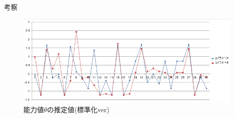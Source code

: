 \documentclass[aspectratio=169, dvipdfmx, 12pt]{beamer}
\begin{document}
\begin{frame}
  \begin{block}{考察}
    \vspace{3.5cm}
    \begin{figure}[H]
      \centering
      \includegraphics[bb = 550 100 1 1,scale = 0.7]{bay2bay3.png}
      \vspace{2.5cm}
      \caption{能力値$\theta$の推定値(標準化ver)}
    \end{figure}
  \end{block}
\end{frame}
\end{document}

